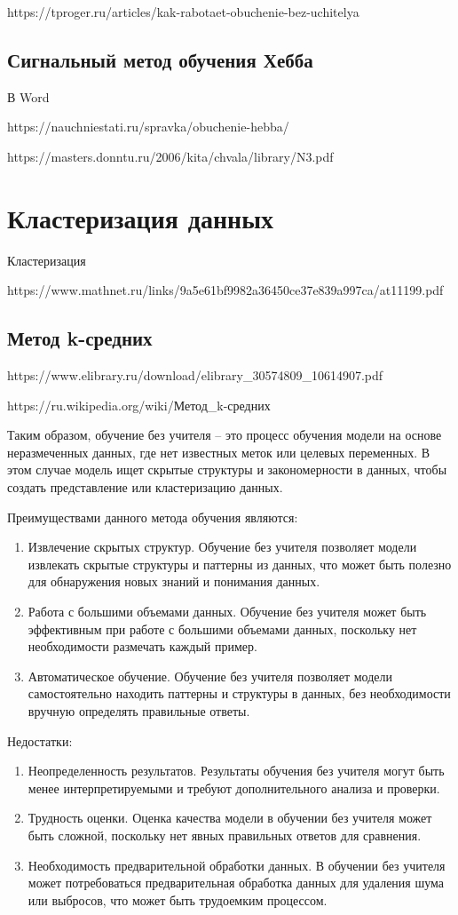 \documentclass[bachelor, och, referat]{SCWorks}
\begin{document}
https://tproger.ru/articles/kak-rabotaet-obuchenie-bez-uchitelya

\subsection{Сигнальный метод обучения Хебба}
В Word

https://nauchniestati.ru/spravka/obuchenie-hebba/

https://masters.donntu.ru/2006/kita/chvala/library/N3.pdf

\section{Кластеризация данных}
Кластеризация

https://www.mathnet.ru/links/9a5e61bf9982a36450ce37e839a997ca/at11199.pdf

\subsection{Метод k-средних}
https://www.elibrary.ru/download/elibrary_30574809_10614907.pdf

https://ru.wikipedia.org/wiki/Метод_k-средних

\conclusion
Таким образом, обучение без учителя -- это процесс обучения модели на основе неразмеченных данных, где нет известных меток или целевых переменных. В этом случае модель ищет скрытые структуры и закономерности в данных, чтобы создать представление или кластеризацию данных.

Преимуществами данного метода обучения являются:
\begin{enumerate}
    \item Извлечение скрытых структур. Обучение без учителя позволяет модели извлекать скрытые структуры и паттерны из данных, что может быть полезно для обнаружения новых знаний и понимания данных.
    \item Работа с большими объемами данных. Обучение без учителя может быть эффективным при работе с большими объемами данных, поскольку нет необходимости размечать каждый пример.
    \item Автоматическое обучение. Обучение без учителя позволяет модели самостоятельно находить паттерны и структуры в данных, без необходимости вручную определять правильные ответы.
\end{enumerate}

Недостатки:
\begin{enumerate}
    \item Неопределенность результатов. Результаты обучения без учителя могут быть менее интерпретируемыми и требуют дополнительного анализа и проверки.
    \item Трудность оценки. Оценка качества модели в обучении без учителя может быть сложной, поскольку нет явных правильных ответов для сравнения.
    \item Необходимость предварительной обработки данных. В обучении без учителя может потребоваться предварительная обработка данных для удаления шума или выбросов, что может быть трудоемким процессом.
\end{enumerate}
\end{document}
